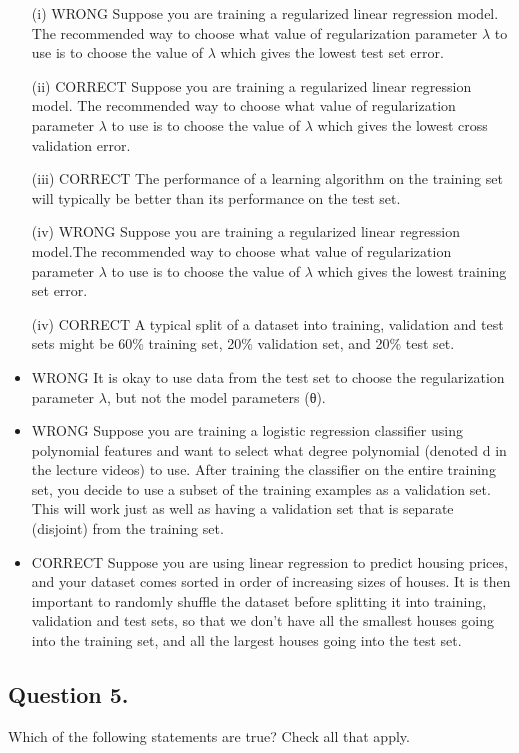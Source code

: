 \documentclass[11pt]{article} %
\begin{document}
\begin{itemize}
	\item[(i)]
WRONG Suppose you are training a regularized linear regression model. The recommended way to choose what value of regularization parameter $\lambda$ to use is to choose the value of $\lambda$ which gives the lowest test set error.
	\item[(ii)]
CORRECT Suppose you are training a regularized linear regression model. The recommended way to choose what value of regularization parameter $\lambda$ to use is to choose the value of $\lambda$ which gives the lowest cross validation error.
	\item[(iii)]
CORRECT The performance of a learning algorithm on the training set will typically be better than its performance on the test set.
	\item[(iv)]
WRONG Suppose you are training a regularized linear regression model.The recommended way to choose what value of regularization parameter $\lambda$ to use is to choose the value of $\lambda$ which gives the lowest training set error.
\item[(iv)] CORRECT A typical split of a dataset into training, validation and test sets might be 60\% training set, 20\% validation set, and 20\% test set.
\item WRONG It is okay to use data from the test set to choose the regularization parameter $\lambda$, but not the model parameters (θ).
\item WRONG Suppose you are training a logistic regression classifier using polynomial features and want to select what degree polynomial (denoted d in the lecture videos) to use. After training the classifier on the entire training set, you decide to use a subset of the training examples as a validation set. This will work just as well as having a validation set that is separate (disjoint) from the training set.

\item CORRECT Suppose you are using linear regression to predict housing prices, and your dataset comes sorted in order of increasing sizes of houses. It is then important to randomly shuffle the dataset before splitting it into training, validation and test sets, so that we don’t have all the smallest houses going into the training set, and all the largest houses going into the test set.
\end{itemize}

\subsection*{Question 5. }
Which of the following statements are true? Check all that apply.
\end{document}
